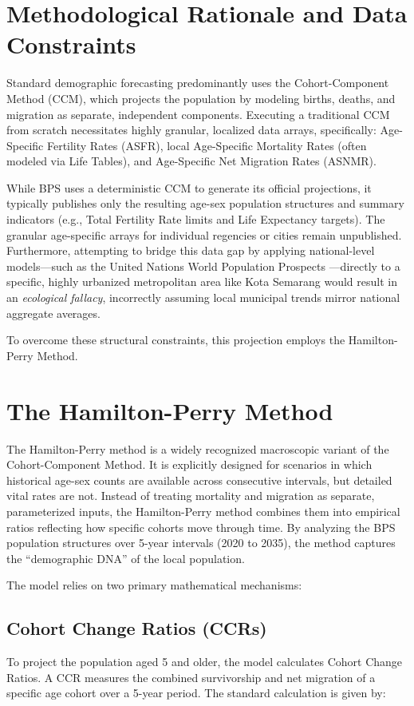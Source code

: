 \documentclass[11pt, a4paper, twocolumn]{article}
\begin{document}
\section*{Methodological Rationale and Data Constraints}

Standard demographic forecasting predominantly uses the Cohort-Component Method (CCM), which projects the population by modeling births, deaths, and migration as separate, independent components. Executing a traditional CCM from scratch necessitates highly granular, localized data arrays, specifically: Age-Specific Fertility Rates (ASFR), local Age-Specific Mortality Rates (often modeled via Life Tables), and Age-Specific Net Migration Rates (ASNMR).

While BPS uses a deterministic CCM to generate its official projections, it typically publishes only the resulting age-sex population structures and summary indicators (e.g., Total Fertility Rate limits and Life Expectancy targets). The granular age-specific arrays for individual regencies or cities remain unpublished. Furthermore, attempting to bridge this data gap by applying national-level models---such as the United Nations World Population Prospects \cite{un2024}---directly to a specific, highly urbanized metropolitan area like Kota Semarang would result in an \textit{ecological fallacy}, incorrectly assuming local municipal trends mirror national aggregate averages.

To overcome these structural constraints, this projection employs the Hamilton-Perry Method.

\section*{The Hamilton-Perry Method}

The Hamilton-Perry method is a widely recognized macroscopic variant of the Cohort-Component Method. It is explicitly designed for scenarios in which historical age-sex counts are available across consecutive intervals, but detailed vital rates are not. Instead of treating mortality and migration as separate, parameterized inputs, the Hamilton-Perry method combines them into empirical ratios reflecting how specific cohorts move through time. By analyzing the BPS population structures over 5-year intervals (2020 to 2035), the method captures the ``demographic DNA'' of the local population.

The model relies on two primary mathematical mechanisms:

\subsection*{Cohort Change Ratios (CCRs)}
To project the population aged 5 and older, the model calculates Cohort Change Ratios. A CCR measures the combined survivorship and net migration of a specific age cohort over a 5-year period. The standard calculation is given by:
\end{document}
